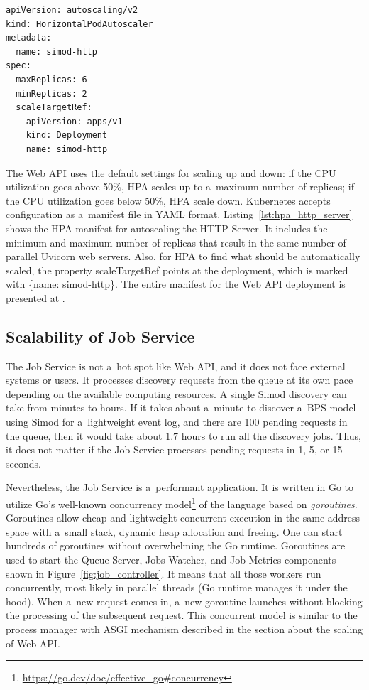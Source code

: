 \documentclass[12pt]{article}
\begin{document}
\vspace{4pt}
\begin{lstlisting}[caption={Horizontal Pod Autoscaler manifest in YAML for \emph{HTTP Server}}, label={lst:hpa_http_server}]
apiVersion: autoscaling/v2
kind: HorizontalPodAutoscaler
metadata:
  name: simod-http
spec:
  maxReplicas: 6
  minReplicas: 2
  scaleTargetRef:
    apiVersion: apps/v1
    kind: Deployment
    name: simod-http
\end{lstlisting}
\vspace{4pt}

\noindent
The Web API uses the default settings for scaling up and down: if the CPU utilization goes above 50\%, HPA scales up to a~maximum number of replicas; if the CPU utilization goes below 50\%, HPA scale down. Kubernetes accepts configuration as a~manifest file in YAML format. Listing~\ref{lst:hpa_http_server} shows the HPA manifest for autoscaling the HTTP Server. It includes the minimum and maximum number of replicas that result in the same number of parallel Uvicorn web servers. Also, for HPA to find what should be automatically scaled, the property {\ttfamily scaleTargetRef} points at the deployment, which is marked with {\ttfamily \{name: simod-http\}}. The entire manifest for the Web API deployment is presented at .

\subsection{Scalability of Job Service} \label{ch:scalability_of_job_service}

The Job Service is not a~hot spot like Web API, and it does not face external systems or users.
It processes discovery requests from the queue at its own pace depending on the available computing resources.
A single Simod discovery can take from minutes to hours. 
If it takes about a~minute to discover a~BPS model using Simod for a~lightweight event log, and there are 100 pending requests in the queue, then it would take about $1.7$ hours to run all the discovery jobs. 
Thus, it does not matter if the Job Service processes pending requests in 1, 5, or 15 seconds.

Nevertheless, the Job Service is a~performant application. It is written in Go to utilize Go's well-known concurrency model\footnote{\href{https://go.dev/doc/effective_go\#concurrency}{https://go.dev/doc/effective\_go\#concurrency}} of the language based on \emph{goroutines}. Goroutines allow cheap and lightweight concurrent execution in the same address space with a~small stack, dynamic heap allocation and freeing. One can start hundreds of goroutines without overwhelming the Go runtime. Goroutines are used to start the Queue Server, Jobs Watcher, and Job Metrics components shown in Figure~\ref{fig:job_controller}. It means that all those workers run concurrently, most likely in parallel threads (Go runtime manages it under the hood). When a~new request comes in, a~new goroutine launches without blocking the processing of the subsequent request. This concurrent model is similar to the process manager with ASGI mechanism described in the section about the scaling of Web API.
\end{document}
